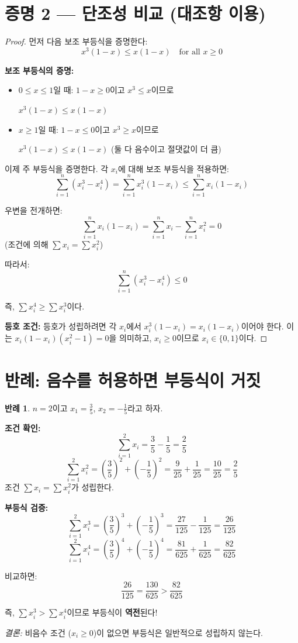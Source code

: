 \documentclass[12pt,a4paper]{article}
\theoremstyle{definition}
\newtheorem{example}{반례}
\begin{document}
\section*{증명 2 --- 단조성 비교 (대조항 이용)}

\begin{proof}
먼저 다음 보조 부등식을 증명한다:
\[
x^3(1-x) \leq x(1-x) \quad \text{for all } x \geq 0
\]

\textbf{보조 부등식의 증명:}
\begin{itemize}[leftmargin=1.5cm]
    \item $0 \leq x \leq 1$일 때: $1-x \geq 0$이고 $x^3 \leq x$이므로

    $x^3(1-x) \leq x(1-x)$

    \item $x \geq 1$일 때: $1-x \leq 0$이고 $x^3 \geq x$이므로

    $x^3(1-x) \leq x(1-x)$ (둘 다 음수이고 절댓값이 더 큼)
\end{itemize}

이제 주 부등식을 증명한다. 각 $x_i$에 대해 보조 부등식을 적용하면:
\[
\sum_{i=1}^n (x_i^3 - x_i^4) = \sum_{i=1}^n x_i^3(1-x_i) \leq \sum_{i=1}^n x_i(1-x_i)
\]

우변을 전개하면:
\[
\sum_{i=1}^n x_i(1-x_i) = \sum_{i=1}^n x_i - \sum_{i=1}^n x_i^2 = 0
\]
(조건에 의해 $\sum x_i = \sum x_i^2$)

따라서:
\[
\sum_{i=1}^n (x_i^3 - x_i^4) \leq 0
\]

즉, $\sum x_i^4 \geq \sum x_i^3$이다.

\textbf{등호 조건:}
등호가 성립하려면 각 $x_i$에서 $x_i^3(1-x_i) = x_i(1-x_i)$이어야 한다.
이는 $x_i(1-x_i)(x_i^2-1) = 0$을 의미하고, $x_i \geq 0$이므로 $x_i \in \{0, 1\}$이다.
\end{proof}

\section*{반례: 음수를 허용하면 부등식이 거짓}

\begin{example}
$n = 2$이고 $x_1 = \frac{3}{5}$, $x_2 = -\frac{1}{5}$라고 하자.

\textbf{조건 확인:}
\[
\sum_{i=1}^2 x_i = \frac{3}{5} - \frac{1}{5} = \frac{2}{5}
\]
\[
\sum_{i=1}^2 x_i^2 = \left(\frac{3}{5}\right)^2 + \left(-\frac{1}{5}\right)^2 = \frac{9}{25} + \frac{1}{25} = \frac{10}{25} = \frac{2}{5}
\]
조건 $\sum x_i = \sum x_i^2$가 성립한다. \checkmark

\textbf{부등식 검증:}
\[
\sum_{i=1}^2 x_i^3 = \left(\frac{3}{5}\right)^3 + \left(-\frac{1}{5}\right)^3 = \frac{27}{125} - \frac{1}{125} = \frac{26}{125}
\]
\[
\sum_{i=1}^2 x_i^4 = \left(\frac{3}{5}\right)^4 + \left(-\frac{1}{5}\right)^4 = \frac{81}{625} + \frac{1}{625} = \frac{82}{625}
\]

비교하면:
\[
\frac{26}{125} = \frac{130}{625} > \frac{82}{625}
\]

즉, $\sum x_i^3 > \sum x_i^4$이므로 부등식이 \textbf{역전}된다!

\textit{결론:} 비음수 조건 ($x_i \geq 0$)이 없으면 부등식은 일반적으로 성립하지 않는다.
\end{example}
\end{document}
